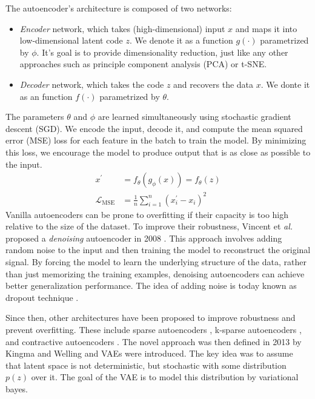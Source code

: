 The autoencoder's architecture is composed of two networks:
\begin{itemize}
    \item \textit{Encoder} network, which takes (high-dimensional) input $x$ and maps it into low-dimensional latent code $z$. We denote it as a
    function $g(\cdot)$ parametrized by $\phi$. It's goal is to provide dimensionality reduction, just like 
    any other approaches such as principle component analysis (PCA) or t-SNE. 
    \item \textit{Decoder} network, which takes the code $z$ and recovers the data $x$. We donte it as an function $f(\cdot)$ parametrized by $\theta$.
\end{itemize}
The parameters $\theta$ and $\phi$ are learned simultaneously using stochastic gradient descent (SGD). We encode the input, decode it, and
compute the mean squared error (MSE) loss for each feature in the batch to train the model. By minimizing this loss, we encourage the model
to produce output that is as close as possible to the input.
\begin{align*}
    x^\prime &= f_\theta(g_\phi(x)) = f_\theta(z) \\
    \mathcal{L}_{\text{MSE}} &= \frac{1}{n} \sum_{i=1}^{n} (x^{\prime}_i - x_i)^2
\end{align*}
Vanilla autoencoders can be prone to overfitting if their capacity is too high relative to the size of the dataset. To improve their
robustness, Vincent et \textit{al.} proposed a \textit{denoising} autoencoder in 2008 \cite{denoising-ae-2008}. This approach involves adding
random noise to the input and then training the model to reconstruct the original signal. By forcing the model to learn the underlying
structure of the data, rather than just memorizing the training examples, denoising autoencoders can achieve better generalization 
performance. The idea of adding noise is today known as dropout technique \cite{dropout-2014}. 

Since then, other architectures have been proposed to improve robustness and prevent overfitting. These include sparse autoencoders
\cite{sparse-ae-2011}, k-sparse autoencoders \cite{ksparse-ae-2014}, and contractive autoencoders \cite{contractive-ae-2011}. The novel 
approach was then defined in 2013 by Kingma and Welling \cite{vae-original-2022} and VAEs were introduced. The key idea was to assume that 
latent space is not deterministic, but stochastic with some distribution $p(z)$ over it. The goal of the VAE is to model this 
distribution by variational bayes. 

